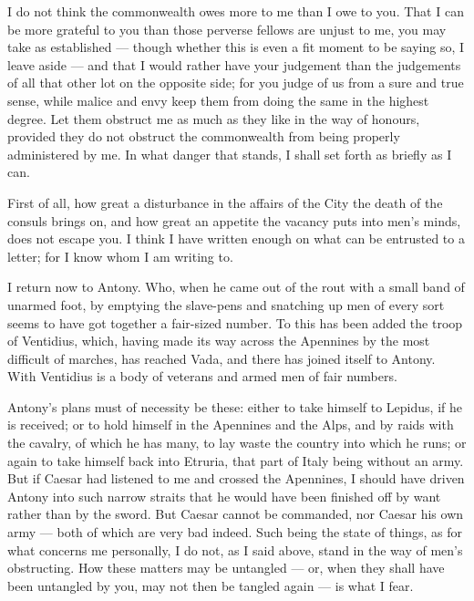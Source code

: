

 I do not think the commonwealth owes more to me than I owe to you. That I can be more grateful to you than those perverse fellows are unjust to me, you may take as established --- though whether this is even a fit moment to be saying so, I leave aside --- and that I would rather have your judgement than the judgements of all that other lot on the opposite side; for you judge of us from a sure and true sense, while malice and envy keep them from doing the same in the highest degree. Let them obstruct me as much as they like in the way of honours, provided they do not obstruct the commonwealth from being properly administered by me. In what danger that stands, I shall set forth as briefly as I can.

 First of all, how great a disturbance in the affairs of the City the death of the consuls brings on, and how great an appetite the vacancy puts into men's minds, does not escape you. I think I have written enough on what can be entrusted to a letter; for I know whom I am writing to.

 I return now to Antony. Who, when he came out of the rout with a small band of unarmed foot, by emptying the slave-pens and snatching up men of every sort seems to have got together a fair-sized number. To this has been added the troop of Ventidius, which, having made its way across the Apennines by the most difficult of marches, has reached Vada, and there has joined itself to Antony. With Ventidius is a body of veterans and armed men of fair numbers.

 Antony's plans must of necessity be these: either to take himself to Lepidus, if he is received; or to hold himself in the Apennines and the Alps, and by raids with the cavalry, of which he has many, to lay waste the country into which he runs; or again to take himself back into Etruria, that part of Italy being without an army. But if Caesar had listened to me and crossed the Apennines, I should have driven Antony into such narrow straits that he would have been finished off by want rather than by the sword. But Caesar cannot be commanded, nor Caesar his own army --- both of which are very bad indeed. Such being the state of things, as for what concerns me personally, I do not, as I said above, stand in the way of men's obstructing. How these matters may be untangled --- or, when they shall have been untangled by you, may not then be tangled again --- is what I fear.

